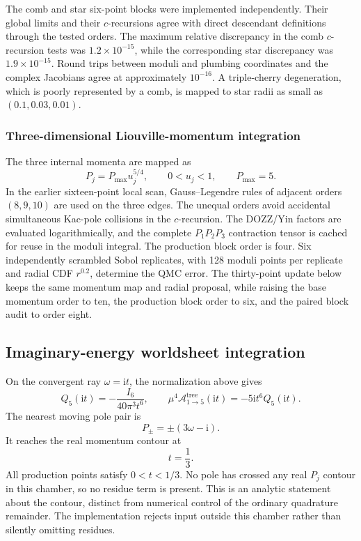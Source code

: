 \documentclass[11pt]{article}
\newcommand{\ii}{\mathrm{i}}
\newcommand{\A}{\mathcal{A}}
\begin{document}
The comb and star six-point blocks were implemented independently.  Their
global limits and their $c$-recursions agree with direct descendant
definitions through the tested orders.  The maximum relative discrepancy in
the comb $c$-recursion tests was $1.2\times10^{-15}$, while the corresponding
star discrepancy was $1.9\times10^{-15}$.  Round trips between moduli and
plumbing coordinates and the complex Jacobians agree at approximately
$10^{-16}$.  A triple-cherry degeneration, which is poorly represented by a
comb, is mapped to star radii as small as $(0.1,0.03,0.01)$.

\subsubsection{Three-dimensional Liouville-momentum integration}

The three internal momenta are mapped as
\begin{equation}
  P_j=P_{\max}u_j^{5/4},
  \qquad 0<u_j<1,
  \qquad P_{\max}=5.
  \label{eq:six-point-momentum-map}
\end{equation}
In the earlier sixteen-point local scan, Gauss--Legendre rules of adjacent
orders $(8,9,10)$ are used on the three
edges.  The unequal orders avoid accidental simultaneous Kac-pole collisions
in the $c$-recursion.  The DOZZ/Yin factors are evaluated logarithmically,
and the complete $P_1P_2P_3$ contraction tensor is cached for reuse in the
moduli integral.  The production block order is four.  Six independently
scrambled Sobol replicates, with 128 moduli points per replicate and radial
CDF $r^{0.2}$, determine the QMC error.  The thirty-point update below keeps
the same momentum map and radial proposal, while raising the base momentum
order to ten, the production block order to six, and the paired block audit
to order eight.

\subsection{Imaginary-energy worldsheet integration}

On the convergent ray $\omega=\ii t$, the normalization above gives
\begin{equation}
  Q_5(\ii t)=-\frac{I_6}{40\pi^3t^6},
  \qquad
  \mu^4\A^{\mathrm{tree}}_{1\to5}(\ii t)
  =-5\ii t^6Q_5(\ii t).
  \label{eq:A15-imaginary-ray}
\end{equation}
The nearest moving pole pair is
\begin{equation}
  P_{\pm}=\pm(3\omega-\ii).
  \label{eq:A15-first-poles}
\end{equation}
It reaches the real momentum contour at
\begin{equation}
  t=\frac13.
  \label{eq:A15-first-wall}
\end{equation}
All production points satisfy $0<t<1/3$.  No pole has crossed any real
$P_j$ contour in this chamber, so no residue term is present.  This is an
analytic statement about the contour, distinct from numerical control of the
ordinary quadrature remainder.  The implementation rejects input outside
this chamber rather than silently omitting residues.
\end{document}
